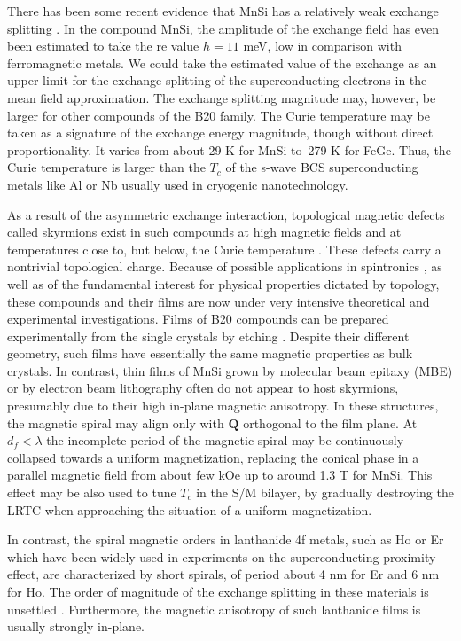 \documentclass[prb,amsmath,amssymb,reprint]{revtex4-2}
\begin{document}
There has been some recent evidence that MnSi has a relatively weak exchange splitting
\cite{Janoschek,Bauer}. In the compound MnSi, the amplitude of the exchange field has even been estimated \cite{Bauer} to take the re value $h=11 $ meV, low  in comparison with ferromagnetic metals.
We could take the estimated value of the exchange
as an upper limit for the exchange splitting of the superconducting electrons in the mean field approximation.
The exchange splitting magnitude may, however,  be larger for other compounds of the B20 family. The Curie temperature may be taken as a signature of the exchange energy magnitude, though without direct proportionality. It varies from about 29 K for MnSi to~279 K for FeGe. Thus, the Curie temperature is larger than the $T_{c}$ of the s-wave BCS superconducting metals like Al or Nb usually used in cryogenic nanotechnology.

As a result of the asymmetric exchange interaction, topological magnetic
defects called skyrmions exist in such compounds at high magnetic fields and
at temperatures close to, but below, the Curie temperature \cite{Neubauer,Li}. These defects carry a nontrivial topological charge. Because of possible
applications in spintronics \cite{Moche}, as well as of the fundamental
interest for physical properties dictated by topology, these compounds and their films are now under very intensive theoretical and experimental investigations.  Films of B20 compounds  can be prepared experimentally from the single crystals by etching \cite{Tonomura,Mochizuki,Yu}.
Despite their different geometry, such films have essentially the same magnetic properties as bulk crystals. In contrast,  thin films of MnSi grown
by molecular beam epitaxy (MBE) or by electron beam lithography often do not appear to host skyrmions, presumably due to their high in-plane magnetic anisotropy. In these structures, the magnetic spiral may align only
with $\mathbf{Q}$ orthogonal to the film plane. At $d_{f}<\lambda $ the incomplete
period of the magnetic spiral may be continuously collapsed towards a uniform
magnetization, replacing the conical phase in a parallel magnetic field from about
few kOe up to around 1.3 T for MnSi. This effect may be also used to tune $T_{c}$ in the S/M bilayer, by gradually destroying the LRTC when approaching the situation of a uniform
magnetization.

In contrast, the spiral magnetic orders in lanthanide 4f metals, such as Ho or Er which have been widely used in experiments on the superconducting
proximity effect,  are characterized by short spirals, of period about 4 nm for Er and 6 nm for Ho. The order of magnitude of the exchange splitting in these materials is unsettled \cite{remark}.
Furthermore, the magnetic anisotropy of such lanthanide films is usually strongly in-plane.
\end{document}
